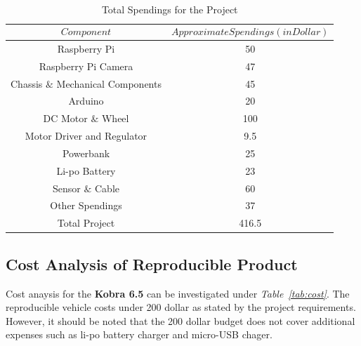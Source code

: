 \documentclass[a4paper,12pt]{article}
\begin{document}
		\begin{table}[H]
			\centering
			\caption{Total Spendings for the Project}
			\begin{tabular}{c|c}
				$$Component$$ &  $$Approximate Spendings (in Dollar)$$  \\ \hline
				Raspberry Pi & 50   \\ \hline
				Raspberry Pi Camera & 47   \\ \hline
				Chassis $\&$ Mechanical Components & 45   \\ \hline
				Arduino  & 20 \\ \hline
				DC Motor $\&$ Wheel & 100 \\ \hline
				Motor Driver and Regulator &  9.5 \\ \hline
				Powerbank & 25 \\ \hline
				Li-po Battery  &  23 \\ \hline
				Sensor $\&$ Cable & 60 \\ \hline
				Other Spendings & 37 \\ \hline
				Total Project & 416.5
			\end{tabular} 
			\label{tab:totalcost}
		\end{table}
		
	\subsection{Cost Analysis of Reproducible Product}

	Cost anaysis for the \textbf{Kobra 6.5} can be investigated under \textit{Table~\ref{tab:cost}}. The reproducible vehicle costs under 200 dollar as stated by the project requirements. However, it should be noted that the 200 dollar budget does not cover additional expenses such as li-po battery charger and micro-USB chager.
\end{document}
